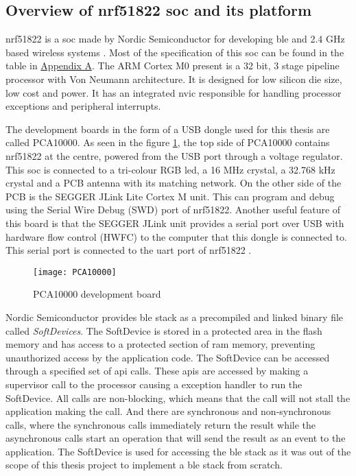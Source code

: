 \subsection{Overview of nrf51822 \gls{soc} and its platform} \label{5nrfPCA}

nrf51822 is a \gls{soc} made by Nordic Semiconductor for developing \gls{ble} and 2.4 GHz based wireless systems \cite{nrf51822page}. Most of the specification of this \gls{soc} can be found in the table in \hyperref[AppendixA]{Appendix A}. The ARM Cortex M0 present is a 32 bit, 3 stage pipeline processor with Von Neumann architecture. It is designed for low silicon die size, low cost and power. It has an integrated \gls{nvic}  responsible for handling processor exceptions and peripheral interrupts. 

The development boards in the form of a USB dongle used for this thesis are called PCA10000. As seen in the figure \ref{pca10000}, the top side of PCA10000 contains nrf51822 at the centre, powered from the USB port through a voltage regulator. This \gls{soc} is connected to a tri-colour RGB led, a 16 MHz crystal, a 32.768  kHz crystal and a PCB antenna with its matching network. On the other side of the PCB is the SEGGER JLink Lite Cortex M unit. This can program and debug using the Serial Wire Debug (SWD) port of nrf51822. Another useful feature of this board is that the SEGGER JLink unit provides a serial port over USB with hardware flow control (HWFC) to the computer that this dongle is connected to. This serial port is connected to the \gls{uart} port of nrf51822 \cite{PrithviR}.

\begin{figure}[h]
\texttt{[image: PCA10000]}
\caption{PCA10000 development board}
\label{pca10000}
\end{figure} 

Nordic Semiconductor provides \gls{ble} stack as a precompiled and linked binary file called \emph{SoftDevices}. The SoftDevice is stored in a protected area in the flash memory and has access to a protected section of \gls{ram} memory, preventing unauthorized access by the application code. The SoftDevice can be accessed through a specified set of \gls{api} calls. These \glspl{api} are accessed by making a supervisor call to the processor causing a exception handler to run the SoftDevice. All calls are non-blocking, which means that the call will not stall the application making the call. And there are synchronous and non-synchronous calls, where the synchronous calls immediately return the result while the asynchronous calls start an operation that will send the result as an event to the application. The SoftDevice is used for accessing the \gls{ble} stack as it was out of the scope of this thesis project to implement a \gls{ble} stack from scratch.

